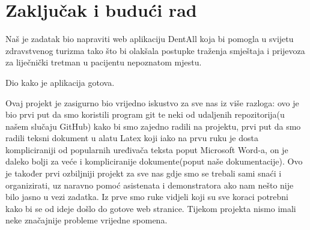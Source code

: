 \chapter{Zaključak i budući rad}

		 Naš je zadatak bio napraviti web aplikaciju DentAll koja bi pomogla u svijetu zdravstvenog turizma tako što bi olakšala postupke traženja smještaja i prijevoza za liječnički tretman u pacijentu nepoznatom mjestu.
		 
		 Dio kako je aplikacija gotova.
		 
		 Ovaj projekt je zasigurno bio vrijedno iskustvo za sve nas iz više razloga: ovo je bio prvi put da smo koristili program git te neki od udaljenih repozitorija(u našem slučaju GitHub) kako bi smo zajedno radili na projektu, prvi put da smo radili teksni dokument u alatu Latex koji iako na prvu ruku je dosta kompliciraniji od popularnih uređivača teksta poput Microsoft Word-a, on je daleko bolji za veće i kompliciranije dokumente(poput naše dokumentacije). Ovo je također prvi ozbiljniji projekt za sve nas gdje smo se trebali sami snaći i organizirati, uz naravno pomoć asistenata i demonstratora ako nam nešto nije bilo jasno u vezi zadatka. Iz prve smo ruke vidjeli koji su sve koraci potrebni kako bi se od ideje došlo do gotove web stranice. Tijekom projekta nismo imali neke značajnije probleme vrijedne spomena.
		
		\eject 